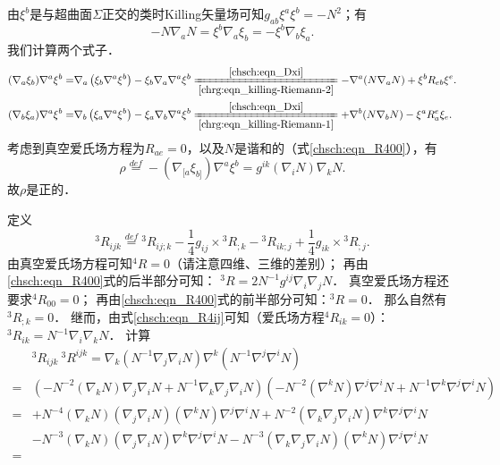 由$\xi^b$是与超曲面$\Sigma$正交的类时Killing矢量场可知$g_{ab}\xi^a \xi^b = -N^2$；有
\begin{equation}\label{chsch:eqn_Dxi}
    -N\nabla_a N= \xi^b \nabla_a \xi_b = -\xi^b \nabla_b \xi_a .
\end{equation}
我们计算两个式子．
\begin{align*}
    (\nabla_a \xi_b) \nabla^a \xi^b =& \nabla_a \left( \xi_b \nabla^a \xi^b\right)
    -\xi_b \nabla_a \nabla^a \xi^b
    \xlongequal[\ref{chrg:eqn_killing-Riemann-2}]{\ref{chsch:eqn_Dxi}}
    - \nabla^a (N\nabla_a N ) + \xi^b R_{eb}{\xi^e} . \\
    (\nabla_b \xi_a) \nabla^a \xi^b =& \nabla_b \left( \xi_a \nabla^a \xi^b\right)
    -\xi_a \nabla_b \nabla^a \xi^b
    \xlongequal[\ref{chrg:eqn_killing-Riemann-1}]{\ref{chsch:eqn_Dxi}}
    + \nabla^b (N\nabla_b N ) - \xi^a R_{a}^e{\xi_e} .
\end{align*}
考虑到真空爱氏场方程为$R_{ae}=0$，以及$N$是谐和的（式\eqref{chsch:eqn_R400}），有
\begin{equation}\label{chsch:eqn_Wxi}
    \rho \overset{def}{=} -  (\nabla_{[a} \xi_{b]}) \nabla^a \xi^b
    =g^{ik}(\nabla_i N) \nabla_k N .
\end{equation}
故$\rho$是正的．



定义
\begin{equation}
    {}^{3}R_{ijk}\overset{def}{=} {}^{3}R_{ij;k}- \frac{1}{4}g_{ij}\times {}^{3}R_{;k}
    -{}^{3}R_{ik;j}+ \frac{1}{4}g_{ik}\times {}^{3}R_{;j} .
\end{equation}
由真空爱氏场方程可知${}^{4}{R}=0$（请注意四维、三维的差别）；
再由\eqref{chsch:eqn_R400}式的后半部分可知：
${}^{3}{R} = 2N^{-1}g^{ij} \nabla_i \nabla_j N $．
真空爱氏场方程还要求${}^{4}{R}_{00}  = 0$；
再由\eqref{chsch:eqn_R400}式的前半部分可知：${}^{3}{R} =0$．
那么自然有${}^{3}{R}_{;k}=0$．
继而，由式\eqref{chsch:eqn_R4ij}可知（爱氏场方程${}^{4}{R}_{ik}=0$）：
${}^{3} {R}_{ik} =  N^{-1} \nabla_i \nabla_k N $．
计算
\setlength{\mathindent}{0em}
\begin{align*}
    &{}^{3}R_{ijk} \  {}^{3}R^{ijk}= \nabla_k (N^{-1} \nabla_j \nabla_i N)
    \nabla^k (N^{-1} \nabla^j \nabla^i N) \\
    =&\left(-N^{-2}(\nabla_k N)\nabla_j \nabla_i N + N^{-1} \nabla_k  \nabla_j \nabla_i N \right)
    \left(-N^{-2}(\nabla^k N)\nabla^j \nabla^i N + N^{-1} \nabla^k  \nabla^j \nabla^i N \right)\\
    =& +N^{-4}(\nabla_k N)(\nabla_j \nabla_i N )(\nabla^k N)\nabla^j \nabla^i N
    + N^{-2} ( \nabla_k  \nabla_j \nabla_i N)\nabla^k  \nabla^j \nabla^i N \\
    &- N^{-3}(\nabla_k N)(\nabla_j \nabla_i N)\nabla^k  \nabla^j \nabla^i N
    - N^{-3} ( \nabla_k  \nabla_j \nabla_i N)(\nabla^k N)\nabla^j \nabla^i N     \\
    =&
\end{align*}\setlength{\mathindent}{2em}

